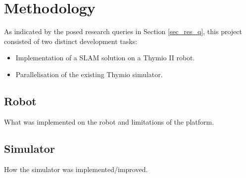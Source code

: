\section{Methodology}
As indicated by the posed research queries in Section \ref{sec_res_q},
this project consisted of two distinct development tasks:
\begin{itemize}
\item Implementation of a SLAM solution on a Thymio II robot.
\item Parallelisation of the existing Thymio simulator.
\end{itemize}

\subsection{Robot}
What was implemented on the robot and limitations of the platform.

\subsection{Simulator}
How the simulator was implemented/improved.
